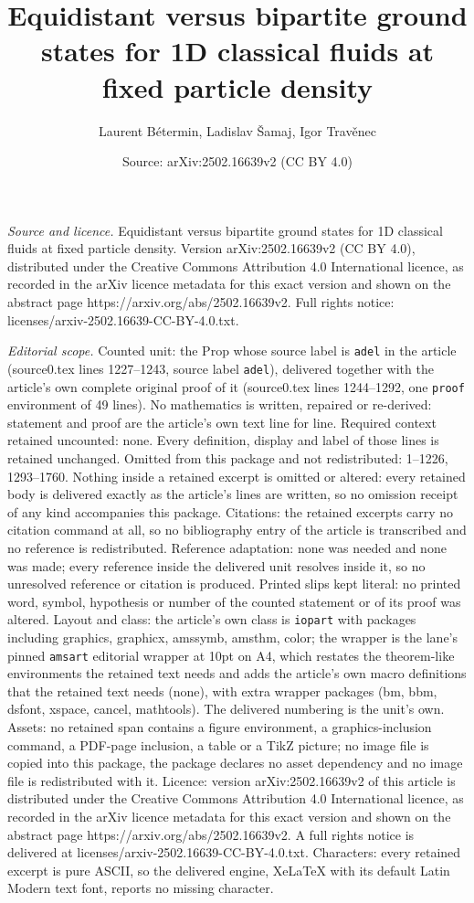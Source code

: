 \documentclass[10pt,a4paper]{amsart}
\title[Equidistant versus bipartite ground states for 1D classical ]{Equidistant versus bipartite ground states for 1D classical fluids at fixed particle density}
\author{Laurent B\'etermin, Ladislav \v{S}amaj, Igor Trav\v{e}nec}
\date{Source: arXiv:2502.16639v2 (CC BY 4.0)}
\begin{document}
\maketitle

\noindent\emph{Source and licence.} Equidistant versus bipartite ground states for 1D classical fluids at fixed particle density. Version arXiv:2502.16639v2 (CC BY 4.0), distributed under the Creative Commons Attribution 4.0 International licence, as recorded in the arXiv licence metadata for this exact version and shown on the abstract page https://arxiv.org/abs/2502.16639v2. Full rights notice: licenses/arxiv-2502.16639-CC-BY-4.0.txt.\par\smallskip

\noindent\textit{Editorial scope.} Counted unit: the Prop whose source label is \texttt{adel} in the article (source0.tex lines 1227--1243, source label \texttt{adel}), delivered together with the article's own complete original proof of it (source0.tex lines 1244--1292, one \texttt{proof} environment of 49 lines). No mathematics is written, repaired or re-derived: statement and proof are the article's own text line for line. Required context retained uncounted: none. Every definition, display and label of those lines is retained unchanged. Omitted from this package and not redistributed: 1--1226, 1293--1760. Nothing inside a retained excerpt is omitted or altered: every retained body is delivered exactly as the article's lines are written, so no omission receipt of any kind accompanies this package. Citations: the retained excerpts carry no citation command at all, so no bibliography entry of the article is transcribed and no reference is redistributed. Reference adaptation: none was needed and none was made; every reference inside the delivered unit resolves inside it, so no unresolved reference or citation is produced. Printed slips kept literal: no printed word, symbol, hypothesis or number of the counted statement or of its proof was altered. Layout and class: the article's own class is \texttt{iopart} with packages including graphics, graphicx, amssymb, amsthm, color; the wrapper is the lane's pinned \texttt{amsart} editorial wrapper at 10pt on A4, which restates the theorem-like environments the retained text needs and adds the article's own macro definitions that the retained text needs (none), with extra wrapper packages (bm, bbm, dsfont, xspace, cancel, mathtools). The delivered numbering is the unit's own. Assets: no retained span contains a figure environment, a graphics-inclusion command, a PDF-page inclusion, a table or a TikZ picture; no image file is copied into this package, the package declares no asset dependency and no image file is redistributed with it. Licence: version arXiv:2502.16639v2 of this article is distributed under the Creative Commons Attribution 4.0 International licence, as recorded in the arXiv licence metadata for this exact version and shown on the abstract page https://arxiv.org/abs/2502.16639v2. A full rights notice is delivered at licenses/arxiv-2502.16639-CC-BY-4.0.txt. Characters: every retained excerpt is pure ASCII, so the delivered engine, XeLaTeX with its default Latin Modern text font, reports no missing character.
\end{document}
